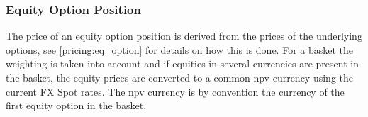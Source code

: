 \subsubsection{Equity Option Position}

The price of an equity option position is derived from the prices of the underlying options, see \ref{pricing:eq_option}
for details on how this is done. For a basket the weighting is taken into account and if equities in several currencies
are present in the basket, the equity prices are converted to a common npv currency using the current FX Spot rates. The
npv currency is by convention the currency of the first equity option in the basket.
